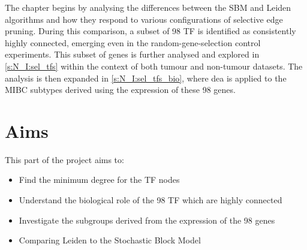 The chapter begins by analysing the differences between the SBM and Leiden algorithms and how they respond to various configurations of selective edge pruning. During this comparison, a subset of 98 TF is identified as consistently highly connected, emerging even in the random-gene-selection control experiments. This subset of genes is further analysed and explored in \cref{s:N_I:sel_tfs} within the context of both tumour and non-tumour datasets. The analysis is then expanded in \cref{s:N_I:sel_tfs_bio}, where \acrfull{dea} is applied to the MIBC subtypes derived using the expression of these 98 genes.






% 

\section{Aims}

This part of the project aims to:
\begin{itemize}
    \item Find the minimum degree for the TF nodes
    \item Understand the biological role of the 98 TF which are highly connected
    \item Investigate the subgroups derived from the expression of the 98 genes
    \item Comparing Leiden to the Stochastic Block Model
\end{itemize}


